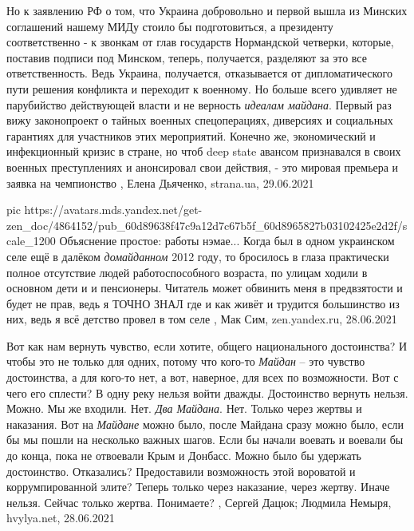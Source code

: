 Но к заявлению РФ о том, что Украина добровольно и первой вышла из Минских
соглашений нашему МИДу стоило бы подготовиться, а президенту соответственно - к
звонкам от глав государств Нормандской четверки, которые, поставив подписи под
Минском, теперь, получается, разделяют за это все ответственность. Ведь
Украина, получается, отказывается от дипломатического пути решения конфликта и
переходит к военному. Но больше всего удивляет не парубийство действующей
власти и не верность \emph{идеалам майдана}. Первый раз вижу законопроект о тайных
военных спецоперациях, диверсиях и социальных гарантиях для участников этих
мероприятий. Конечно же, экономический и инфекционный кризис в стране, но чтоб
deep state авансом признавался в своих военных преступлениях и анонсировал свои
действия, - это мировая премьера и заявка на чемпионство
, 
Елена Дьяченко, strana.ua, 29.06.2021

\ifcmt
  pic https://avatars.mds.yandex.net/get-zen_doc/4864152/pub_60d89638f47c9a12d7c67b5f_60d8965827b03102425e2d2f/scale_1200
\fi
Объяснение простое: работы нэмае... Когда был в одном украинском селе ещё в
далёком \emph{домайданном} 2012 году, то бросилось в глаза практически полное
отсутствие людей работоспособного возраста, по улицам ходили в основном дети и
и пенсионеры. Читатель может обвинить меня в предвзятости и будет не прав, ведь
я ТОЧНО ЗНАЛ где и как живёт и трудится большинство из них, ведь я всё детство
провел в том селе
, 
Мак Сим, zen.yandex.ru, 28.06.2021


Вот как нам вернуть чувство, если хотите, общего национального достоинства? И
чтобы это не только для одних, потому что кого-то \emph{Майдан} – это чувство
достоинства, а для кого-то нет, а вот, наверное, для всех по возможности. Вот с
чего его сплести?  В одну реку нельзя войти дважды. Достоинство вернуть нельзя.
Можно. Мы же входили.  Нет.  \emph{Два Майдана}.  Нет. Только через жертвы и
наказания. Вот на \emph{Майдане} можно было, после Майдана сразу можно было,
если бы мы пошли на несколько важных шагов. Если бы начали воевать и воевали бы
до конца, пока не отвоевали Крым и Донбасс. Можно было бы удержать достоинство.
Отказались? Предоставили возможность этой вороватой и коррумпированной элите?
Теперь только через наказание, через жертву. Иначе нельзя. Сейчас только
жертва. Понимаете?
, 
Сергей Дацюк; Людмила Немыря, hvylya.net, 28.06.2021

